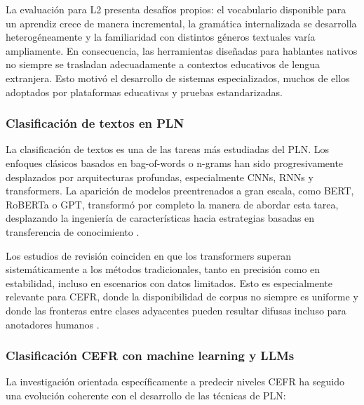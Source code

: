 La evaluación para L2 presenta desafíos propios: el vocabulario disponible para un aprendiz crece de manera incremental, la gramática internalizada se desarrolla heterogéneamente y la familiaridad con distintos géneros textuales varía ampliamente. En consecuencia, las herramientas diseñadas para hablantes nativos no siempre se trasladan adecuadamente a contextos educativos de lengua extranjera. Esto motivó el desarrollo de sistemas especializados, muchos de ellos adoptados por plataformas educativas y pruebas estandarizadas.

\subsubsection{Clasificación de textos en PLN}
La clasificación de textos es una de las tareas más estudiadas del PLN. Los enfoques clásicos basados en bag-of-words o n-grams han sido progresivamente desplazados por arquitecturas profundas, especialmente CNNs, RNNs y transformers. La aparición de modelos preentrenados a gran escala, como BERT, RoBERTa o GPT, transformó por completo la manera de abordar esta tarea, desplazando la ingeniería de características hacia estrategias basadas en transferencia de conocimiento \cite{Zhou2020, Li2021, benchmark}.

Los estudios de revisión coinciden en que los transformers superan sistemáticamente a los métodos tradicionales, tanto en precisión como en estabilidad, incluso en escenarios con datos limitados. Esto es especialmente relevante para CEFR, donde la disponibilidad de corpus no siempre es uniforme y donde las fronteras entre clases adyacentes pueden resultar difusas incluso para anotadores humanos \cite{Kerz2021, Wisniewski2017}.

\subsubsection{Clasificación CEFR con machine learning y LLMs}

La investigación orientada específicamente a predecir niveles CEFR ha seguido una evolución coherente con el desarrollo de las técnicas de PLN:

